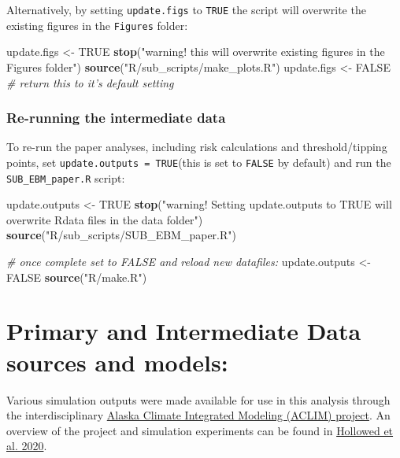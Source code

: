 \documentclass[]{article}
\newenvironment{Shaded}{\begin{snugshade}}{\end{snugshade}}
\newcommand{\KeywordTok}[1]{\textcolor[rgb]{0.13,0.29,0.53}{\textbf{{#1}}}}
\newcommand{\StringTok}[1]{\textcolor[rgb]{0.31,0.60,0.02}{{#1}}}
\newcommand{\CommentTok}[1]{\textcolor[rgb]{0.56,0.35,0.01}{\textit{{#1}}}}
\newcommand{\OtherTok}[1]{\textcolor[rgb]{0.56,0.35,0.01}{{#1}}}
\newcommand{\NormalTok}[1]{{#1}}
\begin{document}
Alternatively, by setting \texttt{update.figs} to \texttt{TRUE} the
script will overwrite the existing figures in the \texttt{Figures}
folder:

\begin{Shaded}
\begin{Highlighting}[]
    \NormalTok{update.figs  <-}\StringTok{ }\OtherTok{TRUE}  
    \KeywordTok{stop}\NormalTok{(}\StringTok{"warning! this will overwrite existing figures in the Figures folder"}\NormalTok{)}
    \KeywordTok{source}\NormalTok{(}\StringTok{"R/sub_scripts/make_plots.R"}\NormalTok{)}
    \NormalTok{update.figs  <-}\StringTok{ }\OtherTok{FALSE}   \CommentTok{# return this to it's default setting}
\end{Highlighting}
\end{Shaded}

\subsubsection{Re-running the intermediate
data}\label{re-running-the-intermediate-data}

To re-run the paper analyses, including risk calculations and
threshold/tipping points, set \texttt{update.outputs\ =\ TRUE}(this is
set to \texttt{FALSE} by default) and run the \texttt{SUB\_EBM\_paper.R}
script:

\begin{Shaded}
\begin{Highlighting}[]
    \NormalTok{update.outputs  <-}\StringTok{ }\OtherTok{TRUE}  
    \KeywordTok{stop}\NormalTok{(}\StringTok{"warning! Setting update.outputs to TRUE will overwrite Rdata files in the data folder"}\NormalTok{)}
    \KeywordTok{source}\NormalTok{(}\StringTok{"R/sub_scripts/SUB_EBM_paper.R"}\NormalTok{)}

    \CommentTok{# once complete set to FALSE and reload new datafiles:}
    \NormalTok{update.outputs  <-}\StringTok{ }\OtherTok{FALSE}  
    \KeywordTok{source}\NormalTok{(}\StringTok{"R/make.R"}\NormalTok{)}
\end{Highlighting}
\end{Shaded}

\section{Primary and Intermediate Data sources and
models:}\label{primary-and-intermediate-data-sources-and-models}

Various simulation outputs were made available for use in this analysis
through the interdisciplinary
\href{\%22https://www.fisheries.noaa.gov/alaska/ecosystems/alaska-climate-integrated-modeling-project\%22}{Alaska
Climate Integrated Modeling (ACLIM) project}. An overview of the project
and simulation experiments can be found in
\href{\%22https://www.frontiersin.org/articles/10.3389/fmars.2019.00775/full\%22}{Hollowed
et al. 2020}.
\end{document}
